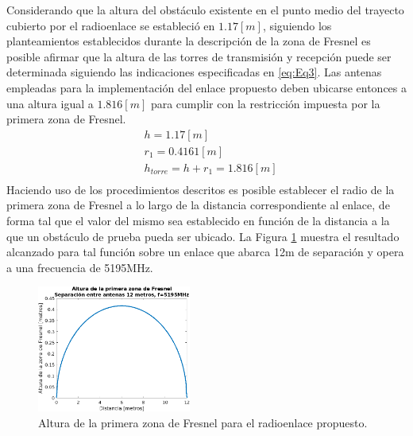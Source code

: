 \documentclass[conference]{IEEEtran}
\begin{document}
Considerando que la altura del obstáculo existente en el punto medio del trayecto cubierto por el radioenlace se estableció en $1.17[m]$, siguiendo 
los planteamientos establecidos durante la descripción de la zona de Fresnel es posible afirmar que la altura de las torres de transmisión y recepción 
puede ser determinada siguiendo las indicaciones especificadas en \ref{eq:Eq3}. Las antenas empleadas para la implementación del enlace propuesto deben ubicarse entonces
a una altura igual a $1.816[m]$ para cumplir con la restricción impuesta por la primera zona de Fresnel.
\begin{equation}
    \label{eq:Eq3}
    \begin{aligned}
        &h =1.17[m]\\
        &r_1 = 0.4161[m]\\
        &h_{torre} = h+r_{1}=1.816[m]\\
    \end{aligned}
\end{equation}
Haciendo uso de los procedimientos descritos es posible establecer el radio de la primera zona de Fresnel a lo
largo de la distancia correspondiente al enlace, de forma tal que el valor del mismo sea establecido en función 
de la distancia a la que un obstáculo de prueba pueda ser ubicado. La Figura \ref{fig:Altura_Fresnel} muestra el resultado alcanzado para 
tal función sobre un enlace que abarca 12m de separación y opera a una frecuencia de 5195MHz.
\begin{figure}
    \centering
          \includegraphics[width=0.45\textwidth]{Altura_Fresnel.png}
        \caption{Altura de la primera zona de Fresnel para el radioenlace propuesto.
        }
        \label{fig:Altura_Fresnel}
\end{figure}
\end{document}
